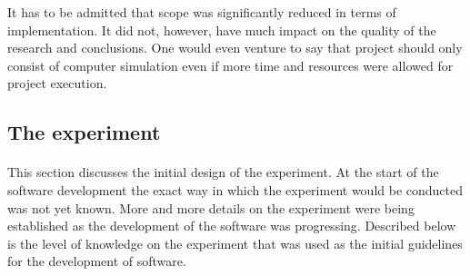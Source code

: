 \documentclass[11pt,english,twoside]{article}
\begin{document}
It has to be admitted that scope was significantly reduced in terms of implementation. It did not, however, have much impact on the quality of the research and conclusions. One would even venture to say that project should only consist of computer simulation even if more time and resources were allowed for project execution. 




\subsection{The experiment}

\paragraph{}

This section discusses the initial design of the experiment. At the start of the software development the exact way in which the experiment would be conducted was not yet known. More and more details on the experiment were being established as the development of the software was progressing. Described below is the level of knowledge on the experiment that was used as the initial guidelines for the development of software.

\par
















\end{document}
